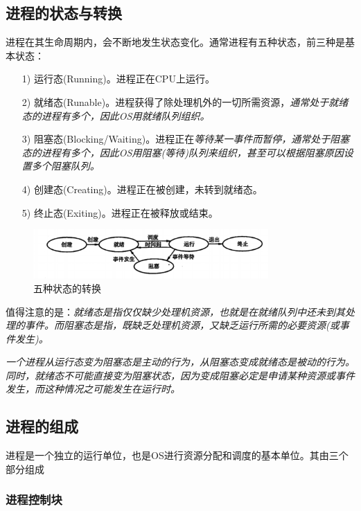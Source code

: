 \subsection{进程的状态与转换}

    进程在其生命周期内，会不断地发生状态变化。通常进程有五种状态，前三种是基本状态：

\begin{itemize}
    \item [1)] 运行态(Running)。进程正在CPU上运行。
    \item [2)] 就绪态(Runable)。进程获得了除处理机外的一切所需资源，\emph{通常处于就绪态的进程有多个，因此OS用就绪队列组织。}
    \item [3)] 阻塞态(Blocking/Waiting)。进程正在\emph{等待某一事件而暂停，通常处于阻塞态的进程有多个，因此OS用阻塞(等待)队列来组织，甚至可以根据阻塞原因设置多个阻塞队列。}
    \item [4)] 创建态(Creating)。进程正在被创建，未转到就绪态。
    \item [5)] 终止态(Exiting)。进程正在被释放或结束。
\end{itemize}

\begin{figure}[!htbp]
    \centering
    \includegraphics[width=0.8\textwidth]{image/chapter02/五种状态的转换.png}
    \caption{五种状态的转换}
\end{figure}

    值得注意的是：\emph{就绪态是指仅仅缺少处理机资源，也就是在就绪队列中还未到其处理的事件。而阻塞态是指，既缺乏处理机资源，又缺乏运行所需的必要资源(或事件发生)。}

    \emph{\color{red}一个进程从运行态变为阻塞态是主动的行为，从阻塞态变成就绪态是被动的行为。同时，就绪态不可能直接变为阻塞状态，因为变成阻塞必定是申请某种资源或事件发生，而这种情况之可能发生在运行时。}

\subsection{进程的组成}

    进程是一个独立的运行单位，也是OS进行资源分配和调度的基本单位。其由三个部分组成

\subsubsection{进程控制块}


